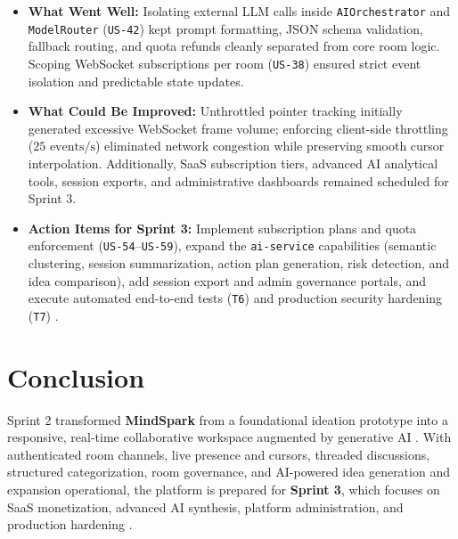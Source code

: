 \begin{itemize}
    \item \textbf{What Went Well:} Isolating external LLM calls inside \texttt{AIOrchestrator} and \texttt{ModelRouter} (\texttt{US-42}) kept prompt formatting, JSON schema validation, fallback routing, and quota refunds cleanly separated from core room logic. Scoping WebSocket subscriptions per room (\texttt{US-38}) ensured strict event isolation and predictable state updates.
    \item \textbf{What Could Be Improved:} Unthrottled pointer tracking initially generated excessive WebSocket frame volume; enforcing client-side throttling ($25\text{ events/s}$) eliminated network congestion while preserving smooth cursor interpolation. Additionally, SaaS subscription tiers, advanced AI analytical tools, session exports, and administrative dashboards remained scheduled for Sprint 3.
    \item \textbf{Action Items for Sprint 3:} Implement subscription plans and quota enforcement (\texttt{US-54}--\texttt{US-59}), expand the \texttt{ai-service} capabilities (semantic clustering, session summarization, action plan generation, risk detection, and idea comparison), add session export and admin governance portals, and execute automated end-to-end tests (\texttt{T6}) and production security hardening (\texttt{T7}) \cite{backlog}.
\end{itemize}

\section{Conclusion}

Sprint 2 transformed \textbf{MindSpark} from a foundational ideation prototype into a responsive, real-time collaborative workspace augmented by generative AI \cite{backlog}. With authenticated room channels, live presence and cursors, threaded discussions, structured categorization, room governance, and AI-powered idea generation and expansion operational, the platform is prepared for \textbf{Sprint 3}, which focuses on SaaS monetization, advanced AI synthesis, platform administration, and production hardening \cite{backlog}.
